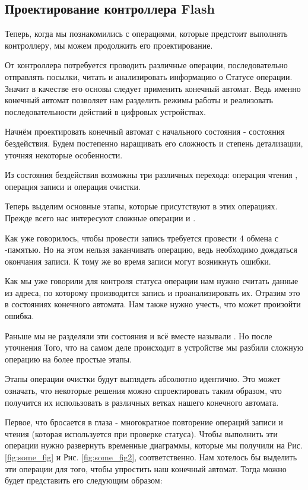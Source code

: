 \subsection{Проектирование контроллера Flash}
\par{Теперь, когда мы познакомились с операциями, которые предстоит выполнять контроллеру, мы можем продолжить его проектирование.}
\par{От контроллера потребуется проводить различные операции, последовательно отправлять посылки, читать и анализировать информацию о Статусе операции. Значит в качестве его основы следует применить конечный автомат. Ведь именно конечный автомат позволяет нам разделить режимы работы и реализовать последовательности действий в цифровых устройствах.}
\par{Начнём проектировать конечный автомат с начального состояния - состояния бездействия. Будем постепенно наращивать его сложность и степень детализации, уточняя некоторые особенности.}
\par{Из состояния бездействия возможны три различных перехода: операция чтения , операция записи и операция очистки.}
\par{Теперь выделим основные этапы, которые присутствуют в этих операциях. Прежде всего нас интересуют сложные операции  и .}
\par{Как уже говорилось, чтобы провести запись требуется провести 4 обмена с -памятью. Но на этом нельзя заканчивать операцию, ведь необходимо дождаться окончания записи. К тому же во время записи могут возникнуть ошибки.}
\par{Как мы уже говорили для контроля статуса операции нам нужно считать данные из адреса, по которому производится запись и проанализировать их. Отразим это в состояниях конечного автомата. Нам также нужно учесть, что может произойти ошибка.}
\par{Раньше мы не разделяли эти состояния и всё вместе называли . Но после уточнения Того, что на самом деле происходит в устройстве мы разбили сложную операцию на более простые этапы.}
\par{Этапы операции очистки будут выглядеть абсолютно идентично. Это может означать, что некоторые решения можно спроектировать таким образом, что получится их использовать в различных ветках нашего конечного автомата.}
\par{Первое, что бросается в глаза - многократное повторение операций записи и чтения (которая используется при проверке статуса). Чтобы выполнить эти операции нужно развернуть временные диаграммы, которые мы получили на Рис.\ref{fig:some_fig} и Рис. \ref{fig:some_fig2}, соответственно. Нам хотелось бы выделить эти операции для того, чтобы упростить наш конечный автомат. Тогда можно будет представить его следующим образом:}

